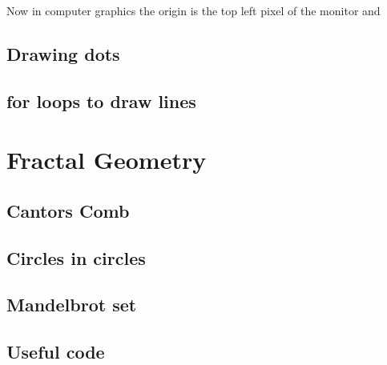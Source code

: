 \documentclass[12pt]{article}
\begin{document}
    Now in computer graphics the origin is the top left pixel of the monitor 
    and 
\subsection{Drawing dots}
\subsection{for loops to draw lines}

\section{Fractal Geometry}
\subsection{Cantors Comb}
\subsection{Circles in circles}
\subsection{Mandelbrot set}

\begin{appendices}
    \section{Useful code}
    \inputminted{c++}{complex.hpp}
\end{appendices}
\end{document}
